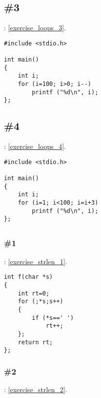 \subsection{\Exercise \#3}
\label{exercise_solutions_loops_3}

\Exercise: \ref{exercise_loops_3}.

\begin{lstlisting}
#include <stdio.h>

int main()
{
	int i;
	for (i=100; i>0; i--)
		printf ("%d\n", i);
};
\end{lstlisting}

\subsection{\Exercise \#4}
\label{exercise_solutions_loops_4}

\Exercise: \ref{exercise_loops_4}.

\begin{lstlisting}
#include <stdio.h>

int main()
{
	int i;
	for (i=1; i<100; i=i+3)
		printf ("%d\n", i);
};
\end{lstlisting}

\subsection{}

\subsubsection{\Exercise \#1}
\label{exercise_solutions_strlen_1}

\Exercise: \ref{exercise_strlen_1}.


\begin{lstlisting}
int f(char *s)
{
	int rt=0;
	for (;*s;s++)
	{
		if (*s==' ')
			rt++;
	};
	return rt;
};
\end{lstlisting}

\subsubsection{\Exercise \#2}
\label{exercise_solutions_strlen_2}

\Exercise: \ref{exercise_strlen_2}.

